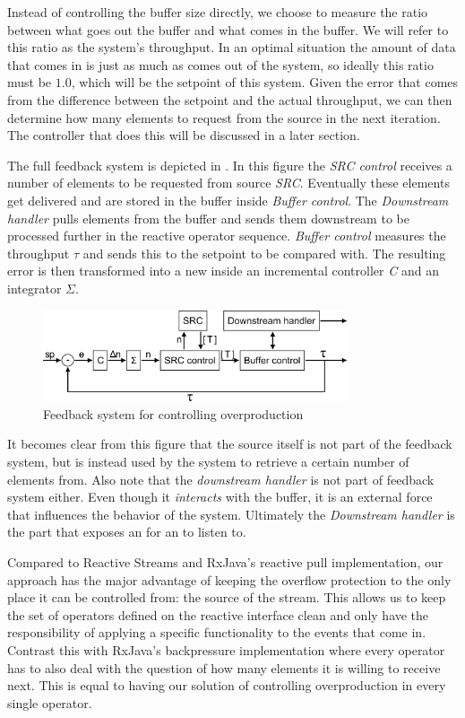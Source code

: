 Instead of controlling the buffer size directly, we choose to measure the ratio between what goes out the buffer and what comes in the buffer. We will refer to this ratio as the system's throughput. In an optimal situation the amount of data that comes in is just as much as comes out of the system, so ideally this ratio must be $1.0$, which will be the setpoint of this system. Given the error that comes from the difference between the setpoint and the actual throughput, we can then determine how many elements to request from the source in the next iteration. The controller that does this will be discussed in a later section.

The full feedback system is depicted in . In this figure the \textit{SRC control} receives a number  of elements to be requested from source \textit{SRC}. Eventually these elements get delivered and are stored in the buffer inside \textit{Buffer control}. The \textit{Downstream handler} pulls elements from the buffer and sends them downstream to be processed further in the reactive operator sequence. \textit{Buffer control} measures the throughput $\tau$ and sends this to the setpoint  to be compared with. The resulting error  is then transformed into a new  inside an incremental controller \textit{C} and an integrator $\Sigma$.

\begin{figure}[H]
	\begin{center}
		\includegraphics[width=0.8\textwidth]{figures/Backpressure-feedback-system.png}
	\end{center}
	\caption{Feedback system for controlling overproduction}
	\label{fig:backpressure-feedback-system}
\end{figure}

It becomes clear from this figure that the source itself is not part of the feedback system, but is instead used by the system to retrieve a certain number of elements from. Also note that the \textit{downstream handler} is not part of feedback system either. Even though it \emph{interacts} with the buffer, it is an external force that influences the behavior of the system. Ultimately the \textit{Downstream handler} is the part that exposes an \obs for an \obv to listen to.

Compared to Reactive Streams and RxJava's reactive pull implementation, our approach has the major advantage of keeping the overflow protection to the only place it can be controlled from: the source of the stream. This allows us to keep the set of operators defined on the reactive interface clean and only have the responsibility of applying a specific functionality to the events that come in. Contrast this with RxJava's backpressure implementation where every operator has to also deal with the question of how many elements it is willing to receive next. This is equal to having our solution of controlling overproduction in every single operator.
